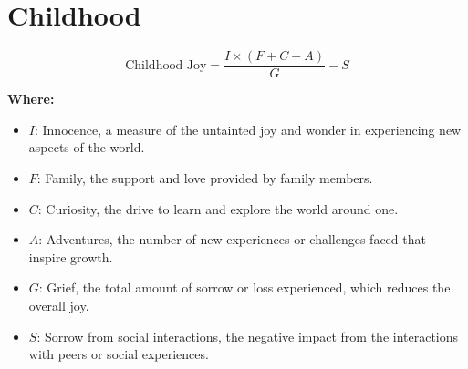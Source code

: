 \chapter{Childhood}

\begin{equation}
\text{Childhood Joy} = \frac{I \times (F + C + A)}{G} - S
\end{equation}

\textbf{Where:}

\begin{itemize}
    \item $I$: Innocence, a measure of the untainted joy and wonder in experiencing new aspects of the world.
    \item $F$: Family, the support and love provided by family members.
    \item $C$: Curiosity, the drive to learn and explore the world around one.
    \item $A$: Adventures, the number of new experiences or challenges faced that inspire growth.
    \item $G$: Grief, the total amount of sorrow or loss experienced, which reduces the overall joy.
    \item $S$: Sorrow from social interactions, the negative impact from the interactions with peers or social experiences.
\end{itemize}